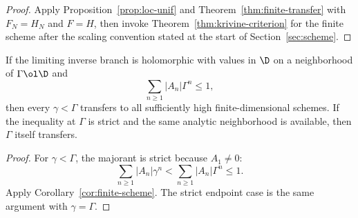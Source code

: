 \begin{proof}
Apply Proposition~\ref{prop:loc-unif} and Theorem~\ref{thm:finite-transfer} with $F_N=H_N$ and $F=H$, then invoke Theorem~\ref{thm:krivine-criterion} for the finite scheme after the scaling convention stated at the start of Section~\ref{sec:scheme}.
\end{proof}

\begin{corollary}\label{cor:margin}
If the limiting inverse branch is holomorphic with values in $\D$ on a neighborhood of $\Gamma\ol\D$ and
\[
  \sum_{n\ge1}|A_n|\Gamma^n\le1,
\]
then every $\gamma<\Gamma$ transfers to all sufficiently high finite-dimensional schemes.  If the inequality at $\Gamma$ is strict and the same analytic neighborhood is available, then $\Gamma$ itself transfers.
\end{corollary}

\begin{proof}
For $\gamma<\Gamma$, the majorant is strict because $A_1\neq0$:
\[
  \sum_{n\ge1}|A_n|\gamma^n<\sum_{n\ge1}|A_n|\Gamma^n\le1.
\]
Apply Corollary~\ref{cor:finite-scheme}.  The strict endpoint case is the same argument with $\gamma=\Gamma$.
\end{proof}
